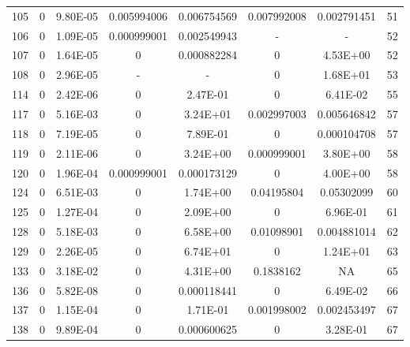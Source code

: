 {\begin{longtable}{cccccccc}
105 & {\color{red}0} & {\color{red}9.80E-05} & {\color{red}0.005994006} & {\color{red}0.006754569} & {\color{red}0.007992008} & {\color{red}0.002791451} & 51 \\
106 & {\color{red}0} & {\color{red}1.09E-05} & {\color{red}0.000999001} & {\color{red}0.002549943} & - & - &  52 \\
107 & {\color{red}0} & {\color{red}1.64E-05} & {\color{red}0} & {\color{red}0.000882284} & {\color{red}0} & 4.53E+00 & 52 \\
108 & {\color{red}0} & {\color{red}2.96E-05} & - & - &  {\color{red}0} & 1.68E+01 & 53 \\
114 & {\color{red}0} & {\color{red}2.42E-06} & {\color{red}0} & 2.47E-01 & {\color{red}0} & 6.41E-02 & 55 \\
117 & {\color{red}0} & {\color{red}5.16E-03} & {\color{red}0} & 3.24E+01 & {\color{red}0.002997003} & {\color{red}0.005646842} & 57 \\
118 & {\color{red}0} & {\color{red}7.19E-05} & {\color{red}0} & 7.89E-01 & {\color{red}0} & {\color{red}0.000104708} & 57 \\
119 & {\color{red}0} & {\color{red}2.11E-06} & {\color{red}0} & 3.24E+00 & {\color{red}0.000999001} & {\color{red}3.80E+00} & 58 \\
120 & {\color{red}0} & {\color{red}1.96E-04} & {\color{red}0.000999001} & {\color{red}0.000173129} & {\color{red}0} & 4.00E+00 & 58 \\
124 & {\color{red}0} & {\color{red}6.51E-03} & {\color{red}0} & 1.74E+00 & {\color{red}0.04195804} & 0.05302099 & 60 \\
125 & {\color{red}0} & {\color{red}1.27E-04} & {\color{red}0} & 2.09E+00 & {\color{red}0} & 6.96E-01 & 61 \\
128 & {\color{red}0} & {\color{red}5.18E-03} & {\color{red}0} & 6.58E+00 & {\color{red}0.01098901} & {\color{red}0.004881014} & 62 \\
129 & {\color{red}0} & {\color{red}2.26E-05} & {\color{red}0} & 6.74E+01 & {\color{red}0} & 1.24E+01 & 63 \\
133 & {\color{red}0} & {\color{red}3.18E-02} & {\color{red}0} & 4.31E+00 & 0.1838162 & NA & 65 \\
136 & {\color{red}0} & {\color{red}5.82E-08} & {\color{red}0} & {\color{red}0.000118441} & {\color{red}0} & 6.49E-02 & 66 \\
137 & {\color{red}0} & {\color{red}1.15E-04} & {\color{red}0} & 1.71E-01 & {\color{red}0.001998002} & {\color{red}0.002453497} & 67 \\
138 & {\color{red}0} & {\color{red}9.89E-04} & {\color{red}0} & {\color{red}0.000600625} & {\color{red}0} & 3.28E-01 & 67 \\

\end{longtable}}
